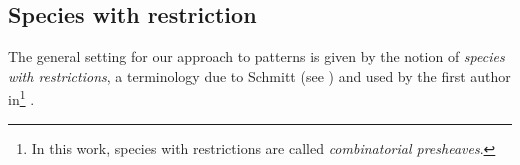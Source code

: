 \documentclass[submission]{FPSAC2023}
\theoremstyle{definition}
\newcommand{\gVec}{\mathsf{gVec}}
\newcommand{\Ssk}{\mathsf{Sp}_\Kb} %
\newcommand{\Kb}{\mathbb{K}}
\newcommand{\rP}{\mathrm{P}}
\newcommand{\tp}{\mathbf{p}}
\newcommand{\Kc}{\mathcal{K}}
\newcommand{\Kcb}{\overline{\Kc}}
\begin{document}

\subsection{Species with restriction}
The general setting for our approach to patterns is given by the notion of \emph{species with restrictions}, a terminology due to Schmitt (see \cite{Schmitt1993}) and used by the first author in\footnote{In this work, species with restrictions are called \emph{combinatorial presheaves}.} \cite{Penaguiao2020}.
\end{document}
